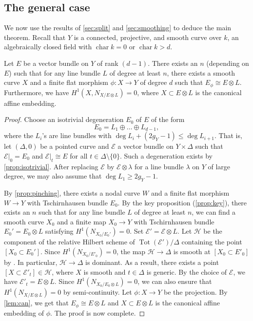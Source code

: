 \documentclass[11 pt]{amsart}
\renewcommand{\k}{k}
\DeclareMathOperator{\Tot}{Tot}
\newcommand{\charac}{\operatorname{char}}
\providecommand {\from}{{\colon}}
\numberwithin{equation}{section}
\begin{document}
\subsection{The general case}
We now use the results of \autoref{sec:split} and \autoref{sec:smoothing} to deduce the main theorem.
Recall that $Y$ is a connected, projective, and smooth curve over $\k$, an algebraically closed field with $\charac \k = 0$ or $\charac \k > d$.
\begin{theorem}
  \label{thm:E}
  Let $E$ be a vector bundle on $Y$ of rank $(d-1)$.
  There exists an $n$ (depending on $E$) such that for any line bundle $L$ of degree at least $n$, there exists a smooth curve $X$ and a finite flat morphism $\phi \from X \to Y$ of degree $d$ such that $E_\phi \cong E \otimes L$.
  Furthermore, we have $H^1(X, N_{X/ E \otimes L}) = 0$, where $X \subset E \otimes L$ is the canonical affine embedding.
\end{theorem}
\begin{proof}
  Choose an isotrivial degeneration $E_0$ of $E$ of the form
  \[ E_0 = L_1 \oplus \dots \oplus L_{d-1},\]
  where the $L_i$'s are line bundles with $\deg L_i + (2g_Y-1) \leq \deg L_{i+1}$.
  That is, let $(\Delta, 0)$ be a pointed curve and $\mathcal E$ a vector bundle on $Y \times \Delta$ such that $\mathcal E|_0 = E_0$ and $\mathcal E|_t \cong E$ for all $t \in \Delta \setminus \{0\}$.
  Such a degeneration exists by \autoref{prop:isotrivial}.
  After replacing $\mathcal E$ by $\mathcal E \otimes \lambda$ for a line bundle $\lambda$ on $Y$ of large degree, we may also assume that $\deg L_1 \geq 2g_Y-1$.
  
  By \autoref{prop:pinching}, there exists a nodal curve $W$ and a finite flat morphism $W \to Y$ with Tschirnhausen bundle $E_0$.
  By the key proposition (\autoref{prop:key}), there exists an $n$ such that for any line bundle $L$ of degree at least $n$, we can find a smooth curve $X_0$ and a finite map $X_0 \to Y$ with Tschirnhausen bundle $E_0' = E_0 \otimes L$ satisfying $H^1(N_{X_0/E_0'}) = 0$.
  Set $\mathcal E' = \mathcal E \otimes L$.
  Let $\mathcal H$ be the component of the relative Hilbert scheme of $\Tot(\mathcal E') / \Delta$ containing the point $[X_0 \subset E_0']$.
  Since $H^1(N_{X_0 / E'_0}) = 0$, the map $\mathcal H \to \Delta$ is smooth at $[X_0 \subset E'_0]$ by \cite[Theorem~3.2.12]{ser:06}.
  In particular, $\mathcal H \to \Delta$ is dominant.
  As a result, there exists a point $[X \subset \mathcal E'_t] \in \mathcal H$, where $X$ is smooth and $t \in \Delta$ is generic.
  By the choice of $\mathcal E$, we have $\mathcal E'_t = E \otimes L$.
  Since $H^1(N_{X_0/E_0 \otimes L}) = 0$, we can also ensure that $H^1(N_{X/E \otimes L}) = 0$ by semi-continuity.
  Let $\phi \from X \to Y$ be the projection.
  By \autoref{lem:can}, we get that $E_\phi \cong E \otimes L$ and $X \subset E \otimes L$ is the canonical affine embedding of $\phi$.
  The proof is now complete.
\end{proof}
\end{document}
